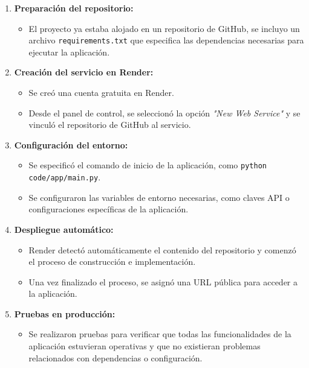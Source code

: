 \begin{enumerate}
    \item \textbf{Preparación del repositorio:}
    \begin{itemize}
        \item El proyecto ya estaba alojado en un repositorio de GitHub, se incluyo un archivo \texttt{requirements.txt} que especifica las dependencias necesarias para ejecutar la aplicación.
    \end{itemize}

    \item \textbf{Creación del servicio en Render:}
    \begin{itemize}
        \item Se creó una cuenta gratuita en Render.
        \item Desde el panel de control, se seleccionó la opción \textit{"New Web Service"} y se vinculó el repositorio de GitHub al servicio.
    \end{itemize}

    \item \textbf{Configuración del entorno:}
    \begin{itemize}
        \item Se especificó el comando de inicio de la aplicación, como \texttt{python code/app/main.py}.
        \item Se configuraron las variables de entorno necesarias, como claves API o configuraciones específicas de la aplicación.
    \end{itemize}

    \item \textbf{Despliegue automático:}
    \begin{itemize}
        \item Render detectó automáticamente el contenido del repositorio y comenzó el proceso de construcción e implementación.
        \item Una vez finalizado el proceso, se asignó una URL pública para acceder a la aplicación.
    \end{itemize}

    \item \textbf{Pruebas en producción:}
    \begin{itemize}
        \item Se realizaron pruebas para verificar que todas las funcionalidades de la aplicación estuvieran operativas y que no existieran problemas relacionados con dependencias o configuración.
    \end{itemize}
\end{enumerate}

